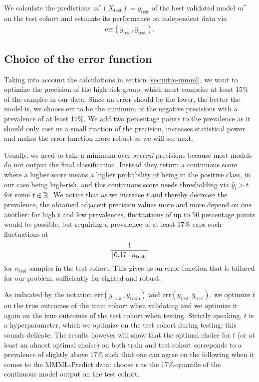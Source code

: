 We calculate the predictions $m^*(X_\text{test}) = \hat{y}_\text{test}$ of the best validated model 
$m^*$ on the test cohort and estimate its performance on independent data via 
\begin{align}
    \text{err}(y_\text{test}, \hat{y}_\text{test}).
\end{align}

\subsection{Choice of the error function}\label{sec:error-function}

Taking into account the calculations in section \ref{sec:intro-mmml},
we want to optimize the precision of the high-risk group, which must comprise at least 15\% of the 
samples in our data. Since an error should be the lower, the better the model is, we choose 
$\text{err}$ to be the minimum of the negative precisions with a prevalence of at least 17\%. We 
add two percentage points to the prevalence as it should only cost us a small fraction of the 
precision, increases statistical power and makes the error function more robust as we will see 
next. 

Usually, we need 
to take a minimum over \textit{several} precisions because most models do not output the final 
classification.
Instead they return a continuous score where a higher score means a higher probability of being
in the positive class, in our case being high-risk, and this continuous score needs thresholding
via $\hat{y}_i > t$ for some $t \in \RR$.
We notice that as we increase $t$ and thereby decrease the prevalence, the obtained 
adjacent precision values more and more depend on one another; for high $t$ and low 
prevalences, fluctuations of up to 50 percentage points would be possible, but requiring a 
prevalence of at least 17\% caps such fluctuations at 
\begin{align}
    \frac{1}{\ceil*{\num{0.17} \cdot n_\text{test}}}
\end{align}
for $n_\text{test}$ samples in the test cohort. This gives us an error function that is tailored 
for our problem, sufficiently far-sighted and robust.

As indicated by the notation $\text{err}(y_\text{train}, \hat{y}_\text{train})$ and 
$\text{err}(y_\text{test}, \hat{y}_\text{test})$, we optimize $t$ on the true outcomes 
of the train cohort when validating and we optimize it again on the true outcomes of the test cohort 
when testing. Strictly speaking, $t$ is a hyperparameter, which we optimize on the 
test cohort during testing; this sounds delicate. The results however will show that the optimal 
choice for $t$ (or at least an 
almost optimal choice) on both train and test cohort correponds to a prevalence of 
slightly above 17\% such that one can agree on the following when it comes to the MMML-Predict data: 
choose $t$ as the 17\%-quantile of the continuous model output on the test cohort.

